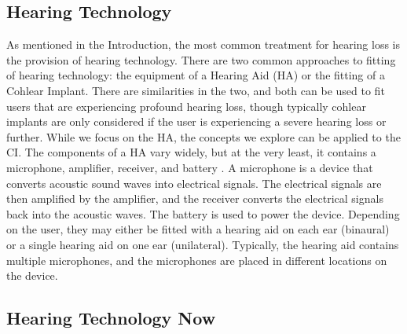 \documentclass[logo,bsc,singlespacing,parskip,online]{infthesis}
\begin{document}
\subsection{Hearing Technology}
As mentioned in the Introduction, the most common treatment for hearing loss 
is the provision of hearing technology. There are two common approaches 
to fitting of hearing technology: the equipment of a Hearing Aid (HA) 
or the fitting of a Cohlear Implant. There are similarities in the 
two, and both can be used to fit users that are experiencing profound hearing loss, 
though typically cohlear implants are only considered if the user is experiencing 
a severe hearing loss or further. While we 
focus on the HA, the concepts we explore can be applied to the CI.
The components of a HA vary widely, but at the very least, 
it contains a microphone, amplifier, receiver, and battery \citep{schuster-bruce_conventional_2025}.
A microphone is a device that converts acoustic sound waves into electrical signals. 
The electrical signals are then amplified by the amplifier, and the receiver converts the electrical 
signals back into the acoustic waves. The battery is used to power the device. 
Depending on the user, they may either be fitted with a hearing aid on each 
ear (binaural) or a single hearing aid on one ear (unilateral). 
Typically, the hearing aid contains multiple microphones, and the microphones 
are placed in different locations on the device. 


\subsection{Hearing Technology Now}


\end{document}
